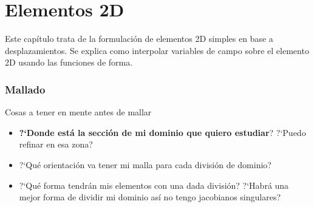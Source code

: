 \part{Elementos 2D}

Este capítulo trata de la formulación de elementos 2D simples en base a desplazamientos. Se explica como interpolar variables de campo sobre el elemento 2D usando las funciones de forma.


\section{Mallado}
 Cosas a tener en mente antes de mallar
\begin{itemize}
	\item \textbf{?`Donde está la sección de mi dominio que quiero estudiar}? ?`Puedo refinar en esa zona?
	\item ?`Qué orientación va tener mi malla para cada división de dominio?
	\item ?`Qué forma tendrán mis elementos con una dada división? ?`Habrá una mejor forma de dividir mi dominio así no tengo jacobianos singulares?
\end{itemize}


